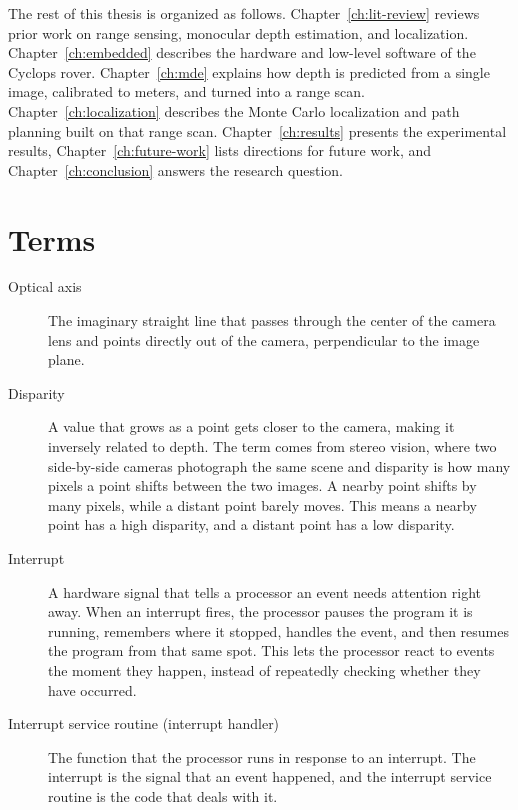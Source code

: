 The rest of this thesis is organized as follows. Chapter~\ref{ch:lit-review} reviews prior work on
range sensing, monocular depth estimation, and localization. Chapter~\ref{ch:embedded} describes
the hardware and low-level software of the Cyclops rover. Chapter~\ref{ch:mde} explains how depth
is predicted from a single image, calibrated to meters, and turned into a range scan.
Chapter~\ref{ch:localization} describes the Monte Carlo localization and path planning built on
that range scan. Chapter~\ref{ch:results} presents the experimental results,
Chapter~\ref{ch:future-work} lists directions for future work, and Chapter~\ref{ch:conclusion}
answers the research question.

\section{Terms}
\label{sec:terms}
\begin{description}
  \item[Optical axis] The imaginary straight line that passes through the center of the camera lens
  and points directly out of the camera, perpendicular to the image plane.
  \item[Disparity] A value that grows as a point gets closer to the camera, making it inversely
  related to depth. The term comes from stereo vision, where two side-by-side cameras photograph
  the same scene and disparity is how many pixels a point shifts between the two images. A nearby
  point shifts by many pixels, while a distant point barely moves. This means a nearby point has a
  high disparity, and a distant point has a low disparity.
  \item[Interrupt] A hardware signal that tells a processor an event needs attention right away.
  When an interrupt fires, the processor pauses the program it is running, remembers where it
  stopped, handles the event, and then resumes the program from that same spot. This lets the
  processor react to events the moment they happen, instead of repeatedly checking whether they
  have occurred.
  \item[Interrupt service routine (interrupt handler)] The function that the processor runs in
  response to an interrupt. The interrupt is the signal that an event happened, and the interrupt
  service routine is the code that deals with it.
\end{description}

